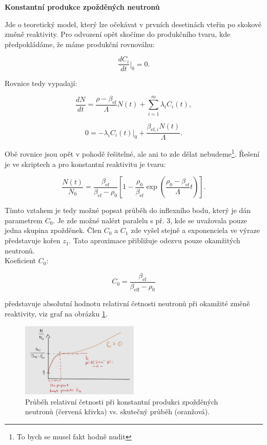 \textbf{Konstantní produkce zpožděných neutronů}

Jde o teoretický model, který lze očekávat v prvních desetinách vteřin po skokové změně reaktivity. Pro odvození opět skočíme do produkčního tvaru, kde předpokládáme, že máme produkční rovnováhu:

$$ \dfrac{dC_i}{dt} |_{0} = 0. $$

Rovnice tedy vypadají:

$$ \dfrac{dN}{dt} = \dfrac{\rho - \beta_{\text{ef}}}{\Lambda} N(t) + \sum_{i=1}^m \lambda_i C_i(t), $$

$$ 0 = -\lambda_i C_i(t) |_{0} + \dfrac{\beta_{\text{ef},i}  N(t)}{\Lambda}. $$

Obě rovnice jsou opět v pohodě řešitelné, ale ani to zde dělat nebudeme\footnote{To bych se musel fakt hodně nudit}. Řešení je ve skriptech a pro konstantní reaktivitu je tvaru:

$$ \dfrac{N(t)}{N_0} = \dfrac{\beta_{\text{ef}}}{\beta_{\text{ef}}-\rho_0} \left [ 1 - \dfrac{\rho_0}{\beta_{\text{ef}}} \exp{ \left ( \dfrac{\rho_0 - \beta_{\text{ef}}}{\Lambda}t \right ) } \right ]. $$

Tímto vztahem je tedy možné popsat průběh do inflexního bodu, který je dán parametrem $C_0$. Je zde možné nalézt paralelu s př. 3, kde se uvažovala pouze jedna skupina zpožděnek. Člen $C_0$ a $C_1$ zde vyšel stejně a exponenciela ve výraze představuje kořen $z_1$. Tato aproximace přibližuje odezvu pouze okamžitých neutronů.\\

Koeficient $C_0$:

$$ C_0 = \dfrac{\beta_{\text{ef}}}{\beta_{\text{eff}} - \rho_0} $$

představuje absolutní hodnotu relativní četnosti neutronů při okamžité změně reaktivity, viz graf na obrázku \ref{fig_konstantni_produkce}.

\begin{figure}[H]
  \centering
  \includegraphics[width=0.5\textwidth]{img/konstantni_produkce.jpg}
  \caption{Průběh relativní četnosti při konstantní produkci zpožděných neutronů (červená křivka) vs. skutečný průběh (oranžová).}
  \label{fig_konstantni_produkce}
\end{figure}

